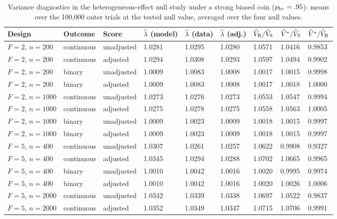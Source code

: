 \begin{table}[!htbp]\centering
\caption{Variance diagnostics in the heterogeneous-effect null study under a strong biased coin ($p_{\rm bc}=.95$): means over the 100,000 outer trials at the tested null value, averaged over the four null values.}
\label{tab:supp-hetero-diag-stress}
\begin{threeparttable}\begin{singlespace}\footnotesize\setlength{\tabcolsep}{3pt}
\begin{tabular}{@{}lllllllll@{}}\toprule
Design & Outcome & Score & $\widehat\lambda$ (model) & $\widehat\lambda$ (data) & $\widehat\lambda$ (adj.) & $\widehat V_{\rm R}/\widehat V_{\rm S}$ & $\widehat V^{*}/\widehat V_{\rm S}$ & $\widehat V^{*}/\widehat V_{\rm R}$\\\midrule
$F=2$, $n=200$ & continuous & unadjusted & 1.0281 & 1.0295 & 1.0280 & 1.0571 & 1.0416 & 0.9853\\
$F=2$, $n=200$ & continuous & adjusted & 1.0294 & 1.0308 & 1.0293 & 1.0597 & 1.0494 & 0.9902\\
$F=2$, $n=200$ & binary & unadjusted & 1.0009 & 1.0083 & 1.0008 & 1.0017 & 1.0015 & 0.9998\\
$F=2$, $n=200$ & binary & adjusted & 1.0009 & 1.0083 & 1.0008 & 1.0017 & 1.0018 & 1.0000\\
$F=2$, $n=1000$ & continuous & unadjusted & 1.0273 & 1.0276 & 1.0273 & 1.0553 & 1.0547 & 0.9994\\
$F=2$, $n=1000$ & continuous & adjusted & 1.0275 & 1.0278 & 1.0275 & 1.0558 & 1.0563 & 1.0005\\
$F=2$, $n=1000$ & binary & unadjusted & 1.0009 & 1.0023 & 1.0009 & 1.0018 & 1.0015 & 0.9997\\
$F=2$, $n=1000$ & binary & adjusted & 1.0009 & 1.0023 & 1.0009 & 1.0018 & 1.0015 & 0.9997\\
$F=5$, $n=400$ & continuous & unadjusted & 1.0307 & 1.0261 & 1.0257 & 1.0622 & 0.9908 & 0.9327\\
$F=5$, $n=400$ & continuous & adjusted & 1.0345 & 1.0294 & 1.0288 & 1.0702 & 1.0665 & 0.9965\\
$F=5$, $n=400$ & binary & unadjusted & 1.0010 & 1.0042 & 1.0016 & 1.0020 & 0.9995 & 0.9974\\
$F=5$, $n=400$ & binary & adjusted & 1.0010 & 1.0042 & 1.0016 & 1.0020 & 1.0026 & 1.0006\\
$F=5$, $n=2000$ & continuous & unadjusted & 1.0342 & 1.0339 & 1.0338 & 1.0697 & 1.0522 & 0.9837\\
$F=5$, $n=2000$ & continuous & adjusted & 1.0352 & 1.0349 & 1.0347 & 1.0715 & 1.0706 & 0.9991\\

\end{tabular}
\end{singlespace}
\end{threeparttable}
\end{table}
